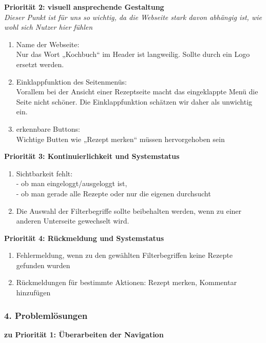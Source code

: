 \documentclass[parskip,10pt,abstracton]{scrartcl}
\newcommand{\sbt}{\begin{picture}(-1,1)(-1,-3)\circle*{3}\end{picture}\ } %
\begin{document}
\textbf{Priorität 2: visuell ansprechende Gestaltung}\\
\textit{Dieser Punkt ist für uns so wichtig, da die Webseite stark davon abhängig ist, wie wohl sich Nutzer hier fühlen}
\begin{enumerate}[\sbt]
 \item Name der Webseite:\\
 Nur das Wort „Kochbuch“ im Header ist langweilig. Sollte durch ein Logo ersetzt werden.
 \item Einklappfunktion des Seitenmenüs:\\
 Vorallem bei der Ansicht einer Rezeptseite macht das eingeklappte Menü die Seite nicht schöner. Die Einklappfunktion schätzen wir daher als unwichtig ein.
 \item erkennbare Buttons:\\
 Wichtige Butten wie „Rezept merken“ müssen hervorgehoben sein\\
\end{enumerate}

\textbf{Priorität 3: Kontinuierlichkeit und Systemstatus}
\begin{enumerate}[\sbt]
 \item Sichtbarkeit fehlt:\\
 - ob man eingeloggt/ausgeloggt ist,\\
 - ob man gerade alle Rezepte oder nur die eigenen durchsucht
 \item Die Auswahl der Filterbegriffe sollte beibehalten werden, wenn zu einer anderen Unterseite gewechselt wird.\\
\end{enumerate}

\textbf{Priorität 4: Rückmeldung und Systemstatus}
\begin{enumerate}[\sbt]
 \item Fehlermeldung, wenn zu den gewählten Filterbegriffen keine Rezepte gefunden wurden
 \item Rückmeldungen für bestimmte Aktionen: Rezept merken, Kommentar hinzufügen
\end{enumerate}

\subsubsection*{4. Problemlösungen}

\textbf{zu Priorität 1: Überarbeiten der Navigation}
\end{document}

